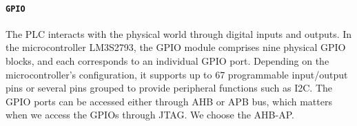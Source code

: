 %
%
%
%






\paragraph{\textbf{\texttt{GPIO}}} The PLC interacts with the physical world through digital inputs and outputs. %
%
%
%
In the microcontroller LM3S2793, the GPIO module comprises nine physical GPIO blocks, and each corresponds to an individual GPIO port. Depending on the microcontroller's configuration, it supports up to 67 programmable input/output pins or several pins grouped to provide peripheral functions such as I2C. The GPIO ports can be accessed either through AHB or APB bus, which matters when we access the GPIOs through JTAG. We choose the AHB-AP.

